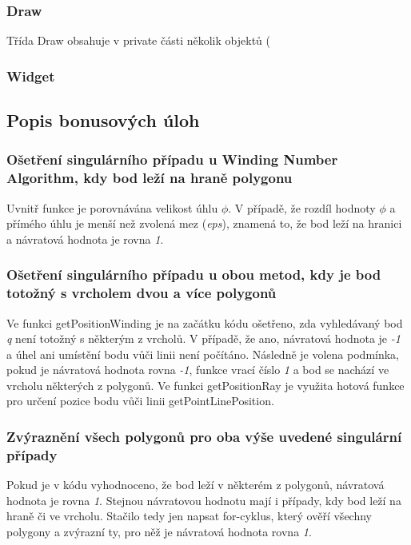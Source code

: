 \documentclass[a4paper, 12pt]{article}
\begin{document}
\subsubsection{Draw}
Třída Draw obsahuje v private části několik objektů (

\subsubsection{Widget}

\subsection{Popis bonusových úloh}
\subsubsection{Ošetření singulárního případu u Winding Number Algorithm, kdy bod leží na hraně polygonu}
Uvnitř funkce je porovnávána velikost úhlu $\phi$. V případě, že rozdíl hodnoty $\phi$ a přímého úhlu je menší než zvolená mez (\textit{eps}), znamená to, že bod leží na hranici a návratová hodnota je rovna  \textit{1}.

\subsubsection{Ošetření singulárního případu u obou metod, kdy je bod totožný s vrcholem dvou a více polygonů}
Ve funkci getPositionWinding je na začátku kódu ošetřeno, zda vyhledávaný bod \textit{q} není totožný s některým z vrcholů. V případě, že ano, návratová hodnota je \textit{-1} a úhel ani umístění bodu vůči linii není počítáno. Následně je volena podmínka, pokud je návratová hodnota rovna \textit{-1}, funkce vrací číslo \textit{1} a bod se nachází ve vrcholu některých z polygonů. Ve funkci getPositionRay je využita hotová funkce pro určení pozice bodu vůči linii getPointLinePosition.

\subsubsection{Zvýraznění všech polygonů pro oba výše uvedené singulární případy}
Pokud je v kódu vyhodnoceno, že bod leží v některém z polygonů, návratová hodnota je rovna \textit{1}. Stejnou návratovou hodnotu mají i případy, kdy bod leží na hraně či ve vrcholu. Stačilo tedy jen napsat for-cyklus, který ověří všechny polygony a zvýrazní ty, pro něž je návratová hodnota rovna \textit{1}. 
\end{document}
